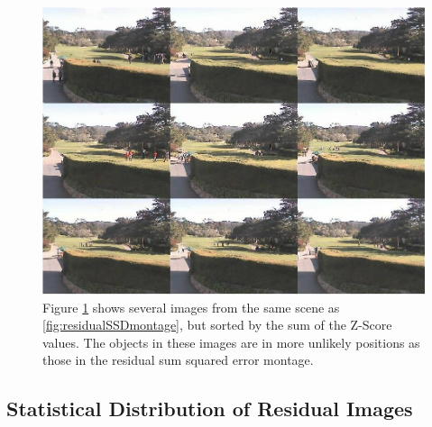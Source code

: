 \begin{figure}
	\centering
		\includegraphics[width=1\textwidth]{figures/residualZScoreMontage.jpg}
	
	
		\caption[Z-Score Montage.]{Figure \ref{fig:residualZScoreMontage} shows several images from the same scene as \ref{fig:residualSSDmontage}, but sorted by the sum of the Z-Score values.  The objects in these images are in more unlikely positions as those in the residual sum squared error montage.}
		\label{fig:residualZScoreMontage}
\end{figure}





\subsection{Statistical Distribution of Residual Images}



